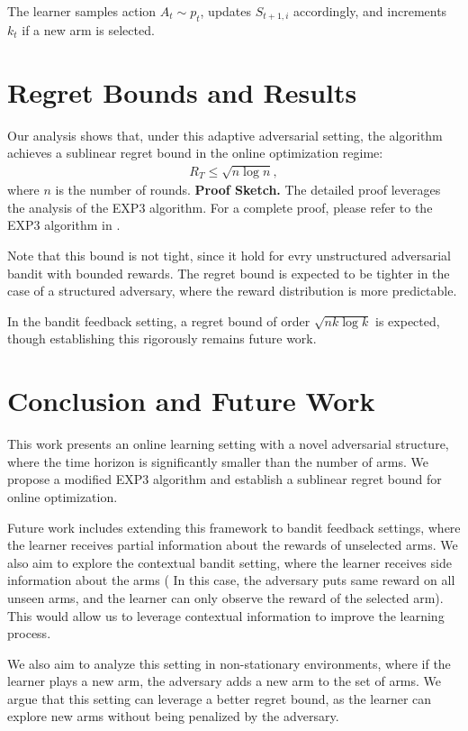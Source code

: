 \documentclass[10pt,twocolumn]{article}
\begin{document}
The learner samples action $A_t \sim p_t$, updates $S_{t+1,i}$ accordingly, and increments $k_t$ if a new arm is selected.

\section{Regret Bounds and Results}

Our analysis shows that, under this adaptive adversarial setting, the algorithm achieves a sublinear regret bound in the online optimization regime:
\begin{align*}
    R_T \leq \sqrt{n \log n},
\end{align*}
where $n$ is the number of rounds.
\medskip
\noindent\textbf{Proof Sketch.} The detailed proof leverages the analysis of the EXP3 algorithm. For a complete proof, please refer to the EXP3 algorithm in \cite{Auer2002}.

Note that this bound is not tight, since it hold for evry unstructured adversarial bandit with bounded rewards. The regret bound is expected to be tighter in the case of a structured adversary, where the reward distribution is more predictable.

In the bandit feedback setting, a regret bound of order $\sqrt{n k \log k}$ is expected, though establishing this rigorously remains future work.

\section{Conclusion and Future Work}

This work presents an online learning setting with a novel adversarial structure, where the time horizon is significantly smaller than the number of arms. We propose a modified EXP3 algorithm and establish a sublinear regret bound for online optimization.

Future work includes extending this framework to bandit feedback settings, where the learner receives partial information about the rewards of unselected arms. We also aim to explore the contextual bandit setting, where the learner receives side information about the arms ( In this case, the adversary puts same reward on all unseen arms, and the learner can only observe the reward of the selected arm). This would allow us to leverage contextual information to improve the learning process.

We also aim to analyze this setting in non-stationary environments, where if the learner plays a new arm, the adversary adds a new arm to the set of arms. We argue that this setting can leverage a better regret bound, as the learner can explore new arms without being penalized by the adversary.
\end{document}
